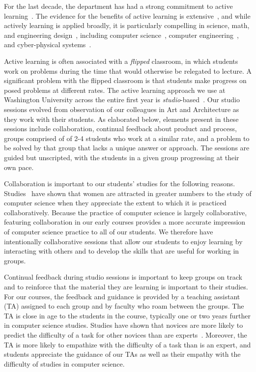 For the last decade, the department has had a strong commitment to
active learning~\cite{scbggg10,sgcggt10}.
The evidence for the benefits of active learning is
extensive~\cite{jjs98,lst99,Prince04,rss97},
and while actively learning is applied broadly, it is particularly
compelling in science, math, and engineering
design~\cite{Freeman14,lst99,Hake98,Byerley01,kb06}, including computer
science~\cite{McConnell96,tlb01,skltc10,ag13},
computer engineering~\cite{hmdpa04,sr02},
and cyber-physical systems~\cite{me14,mmy16}.

Active learning is often associated with a \emph{flipped} classroom, in
which students work on problems during the time that would otherwise be
relegated to lecture.  A significant problem with the flipped classroom is
that students make progress on posed problems at different
rates.
The active learning approach we use at Washington University across the entire
first year is \emph{studio}-based~\cite{hnc08}.
Our studio sessions evolved from observation of our colleagues in
Art and Architecture as they work with their students.  As elaborated below,
elements present in
these sessions include collaboration, continual feedback about product
and process, groups comprised of of 2-4 students who work at a similar rate,
and a problem to be solved by that group that lacks a unique
answer or approach.  The sessions are guided but unscripted, with the
students in a given group progressing at their own pace.

Collaboration is important to our students' studies for the following reasons.
Studies~\cite{Krause:2012:EFL:2157136.2157192} have shown that women are
attracted in greater numbers to the study of computer science when they
appreciate the extent to which it is practiced collaboratively.  Because
the practice of computer science is largely collaborative, featuring collaboration
in our early courses provides a more accurate impression of computer science
practice to all of our students.  We therefore have intentionally collaborative
sessions that allow our students to enjoy learning by interacting with others
and to develop the skills that are useful for working in groups.

Continual feedback during studio sessions is important to keep groups on
track and to reinforce that the material they are learning is important to
their studies.  For our courses, the feedback and guidance is provided by
a teaching assistant (TA) assigned to each group and by faculty who
roam between the groups.  The TA is close in age to the students in the
course, typically one or two years further in computer science studies.
Studies have shown that novices are more likely to predict the difficulty
of a task for other novices than are experts~\cite{Hinds:1999}.  Moreover,
the TA is more likely to empathize with the difficulty of a task than is
an expert, and students appreciate the guidance of our TAs as well as their
empathy with the difficulty of studies in computer science.

